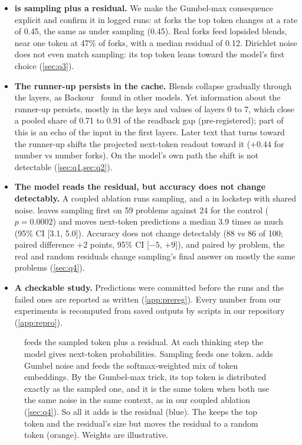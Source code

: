 \begin{itemize}[leftmargin=1.2em,itemsep=2pt,topsep=3pt]
\item \textbf{\GST{} is sampling plus a residual.}
We make the Gumbel-max consequence explicit and confirm it in logged runs:
at forks the top token changes at a rate of 0.45, the same as under sampling (0.45). %
Real forks feed lopsided blends, near one token at 47\% of forks, with a median residual of 0.12. %
Dirichlet noise does not even match sampling: its top token leans toward the model's first choice
(\cref{sec:q3}).
\item \textbf{The runner-up persists in the cache.}
Blends collapse gradually through the layers, as Backour~\cite{backour2026dynamics} found in other models.
Yet information about the runner-up persists, mostly in the keys and values of layers 0 to 7, which close a pooled %
share of 0.71 to 0.91 of the readback gap (pre-registered); part of this is an echo of the input in the first layers. %
Later text that turns toward the runner-up shifts the projected next-token readout toward it ($+0.44$ for number %
vs number forks).
On the model's own path the shift is not detectable (\cref{sec:q1,sec:q2}).
\item \textbf{The model reads the residual, but accuracy does not change detectably.}
A coupled ablation runs sampling, \ST{} and a \ctrl{} in lockstep with shared noise.
\ST{} leaves sampling first on 59 problems against 24 for the control ($p = 0.0002$) %
and moves next-token predictions a median 3.9 times as much (95\% CI [3.1, 5.0]). %
Accuracy does not change detectably (88 vs 86 of 100; paired difference $+2$ points, 95\% CI [$-5$, $+9$]), %
and paired by problem, the real and random residuals change sampling's final answer on mostly the same problems
(\cref{sec:q4}).
\item \textbf{A checkable study.}
Predictions were committed before the runs and the failed ones are reported as written (\cref{app:prereg}).
Every number from our experiments is recomputed from saved outputs by scripts in our repository (\cref{app:repro}).
\end{itemize}

\begin{figure}[t]
\centering

\caption{\GST{} feeds the sampled token plus a residual.
At each thinking step the model gives next-token probabilities.
Sampling feeds one token.
\GST{} adds Gumbel noise and feeds the softmax-weighted mix of token embeddings.
By the Gumbel-max trick, its top token is distributed exactly as the sampled one,
and it is the same token when both use the same noise in the same context, as in our coupled ablation (\cref{sec:q4}).
So all it adds is the residual (blue).
The \ctrl{} keeps the top token and the residual's size but moves the residual to a random token (orange).
Weights are illustrative.}
\label{fig:concept}
\end{figure}

